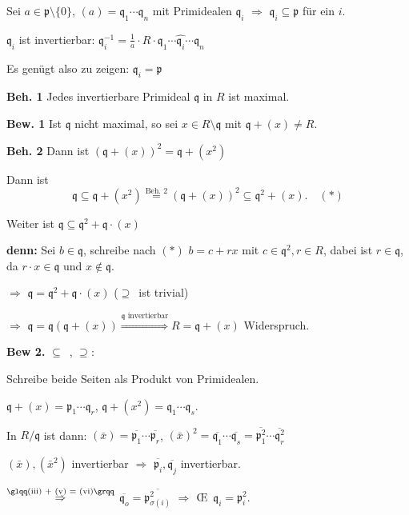 \documentclass[a4paper, 10pt]{report}
\begin{document}
\begin{Bew}
\begin{description}
Sei $a \in \mathfrak{p}\setminus \{0\}$, $(a) = \mathfrak{q}_1 \cdots \mathfrak{q}_n$ mit Primidealen $\mathfrak{q}_i$ $\Rightarrow$ $\mathfrak{q}_i \subseteq \mathfrak{p}$ f\"ur ein $i$.

$\mathfrak{q}_i$ ist invertierbar: $\mathfrak{q}_i^{-1} = \frac{1}{a} \cdot R \cdot \mathfrak{q}_1 \cdots \widehat{\mathfrak{q}_i} \cdots \mathfrak{q}_n$

Es gen\"ugt also zu zeigen: $\mathfrak{q}_i = \mathfrak{p}$

\textbf{Beh. 1} Jedes invertierbare Primideal $\mathfrak{q}$ in $R$ ist maximal.

\textbf{Bew. 1}
Ist $\mathfrak{q}$ nicht maximal, so sei $x \in R \setminus \mathfrak{q}$ mit $\mathfrak{q} + (x) \neq R$.

\textbf{Beh. 2} Dann ist $(\mathfrak{q} + (x))^2 = \mathfrak{q} + (x^2)$

Dann ist
\[
\mathfrak{q} \subseteq \mathfrak{q} + (x^2) \overset{\text{Beh. 2}}{=}
(\mathfrak{q} + (x))^2 \subseteq \mathfrak{q}^2 + (x).\quad(\ast)
\]

Weiter ist $\mathfrak{q} \subseteq \mathfrak{q}^2 + \mathfrak{q} \cdot (x)$

\textbf{denn:} Sei $b \in \mathfrak{q}$, schreibe nach $(\ast)$ $b = c + r x$ mit $c \in \mathfrak{q}^2, r \in R$, dabei ist $r \in \mathfrak{q}$, da $r \cdot x \in \mathfrak{q}$ und $x \notin \mathfrak{q}$.

$\Rightarrow$ $\mathfrak{q} = \mathfrak{q}^2 + \mathfrak{q} \cdot (x)$ (\glqq$\supseteq$\grqq\ ist trivial)

$\Rightarrow$ $\mathfrak{q} = \mathfrak{q} (\mathfrak{q} + (x)) \overset{\mathfrak{q}\text{ invertierbar}}\Rightarrow R = \mathfrak{q} + (x)$ Widerspruch.

\textbf{Bew 2.} \glqq$\subseteq$\grqq\ \chk, \glqq$\supseteq$\grqq:

Schreibe beide Seiten als Produkt von Primidealen.

$\mathfrak{q} + (x) = \mathfrak{p}_1 \cdots \mathfrak{q}_r$, $\mathfrak{q} + (x^2) = \mathfrak{q}_1 \cdots \mathfrak{q}_s$.

In $R / \mathfrak{q}$ ist dann: $(\bar{x}) = \overline{\mathfrak{p}_1} \cdots \overline{\mathfrak{p}_r}$, $(\bar{x})^2 = \overline{\mathfrak{q}_1} \cdots \overline{\mathfrak{q}_s} = \overline{\mathfrak{p}_1^2} \cdots \overline{\mathfrak{q}_r^2}$

$(\bar{x}), (\bar{x}^2)$ invertierbar $\Rightarrow$ $\overline{\mathfrak{p}_i}, \overline{\mathfrak{q}_j}$ invertierbar.

$\overset{\text{\glqq(iii) + (v) = (vi)\grqq}}{\Rightarrow}$
$\overline{\mathfrak{q}_o} = \overline{\mathfrak{p}_{\sigma(i)}^2}$
$\Rightarrow$ \OE\  $\mathfrak{q}_i = \mathfrak{p}_i^2$.

\end{description}
\end{Bew}
\end{document}
